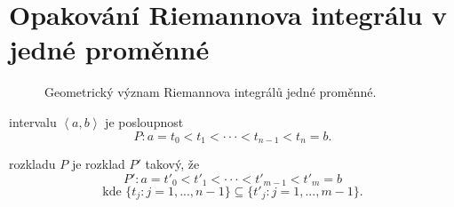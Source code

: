\documentclass[../main.tex]{subfiles}
\begin{document}
\section{Opakování Riemannova integrálu v jedné proměnné}

\begin{figure}[h]
	\centering
	\hspace{3em}
	\hspace{3em}
	\caption{Geometrický význam Riemannova integrálů jedné proměnné.}
\end{figure}

\begin{definitionnodot}[Rozdělení]
	intervalu $\left<a,b\right>$ je posloupnost 
	\[P : a = t_0 < t_1 < \cdot \cdot \cdot < t_{n-1} < t_n = b.\]
\end{definitionnodot}

\begin{definitionnodot}[Zjemnění]
	rozkladu $P$ je rozklad $P'$ takový, že
		\[P' : a = t'_0 < t'_1 < \cdot \cdot \cdot < t'_{m-1} < t'_m = b\]
		\[\text{kde }\{t_j: j = 1,...,n-1\}\subseteq \{t'_j : j = 1,...,m-1\}.\]
\end{definitionnodot}
\end{document}

